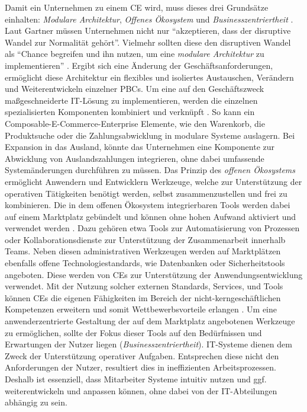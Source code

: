 Damit ein Unternehmen zu einem \ac{CE} wird, muss dieses drei Grundsätze einhalten: \textit{Modulare Architektur}, \textit{Offenes Ökosystem} und \textit{Businesszentriertheit} \cite{.20230313}. Laut Gartner müssen Unternehmen nicht nur \enquote{akzeptieren, dass der disruptive Wandel zur Normalität gehört}. Vielmehr sollten diese den disruptiven Wandel als \enquote{Chance begreifen und ihn nutzen, um eine \textit{modulare Architektur} zu implementieren} \cite{.20230313}. Ergibt sich eine Änderung der Geschäftsanforderungen, ermöglicht diese Architektur ein flexibles und isoliertes Austauschen, Verändern und Weiterentwickeln einzelner PBCs. Um eine auf den Geschäftszweck maßgeschneiderte IT-Lösung zu implementieren, werden die einzelnen spezialisierten Komponenten kombiniert und verknüpft \cite[315]{Chang.1019202010232020}. So kann ein Composable-E-Commerce-Enterprise Elemente, wie den Warenkorb, die Produktsuche oder die Zahlungsabwicklung in modulare Systeme auslagern. Bei Expansion in das Ausland, könnte das Unternehmen eine Komponente zur Abwicklung von Auslandszahlungen integrieren, ohne dabei umfassende Systemänderungen durchführen zu müssen. Das Prinzip des \textit{offenen Ökosystems} ermöglicht Anwendern und Entwicklern Werkzeuge, welche zur Unterstützung der operativen Tätigkeiten benötigt werden, selbst zusammenzustellen und frei zu kombinieren. Die in dem offenen Ökosystem integrierbaren Tools werden dabei auf einem Marktplatz gebündelt und können ohne hohen Aufwand aktiviert und verwendet werden \cite[58]{.2009}. Dazu gehören etwa Tools zur Automatisierung von Prozessen oder Kollaborationsdienste zur Unterstützung der Zusammenarbeit innerhalb Teams. Neben diesen administrativen Werkzeugen werden auf Marktplätzen ebenfalls offene Technologiestandards, wie Datenbanken oder Sicherheitstools angeboten. Diese werden von CEs zur Unterstützung der Anwendungsentwicklung verwendet. Mit der Nutzung solcher externen Standards, Services, und Tools können CEs die eigenen Fähigkeiten im Bereich der nicht-kerngeschäftlichen Kompetenzen erweitern und somit Wettbewerbsvorteile erlangen \cite[7]{Sensedia.2020}. Um eine anwenderzentrierte Gestaltung der auf dem Marktplatz angebotenen Werkzeuge zu ermöglichen, sollte der Fokus dieser Tools auf den Bedürfnissen und Erwartungen der Nutzer liegen (\textit{Businesszentriertheit}). IT-Systeme dienen dem Zweck der Unterstützung operativer Aufgaben. Entsprechen diese nicht den Anforderungen der Nutzer, resultiert dies in ineffizienten Arbeitsprozessen. Deshalb ist essenziell, dass Mitarbeiter Systeme intuitiv nutzen und ggf. weiterentwickeln und anpassen können, ohne dabei von der IT-Abteilungen abhängig zu sein.\cite{.20230313} 

